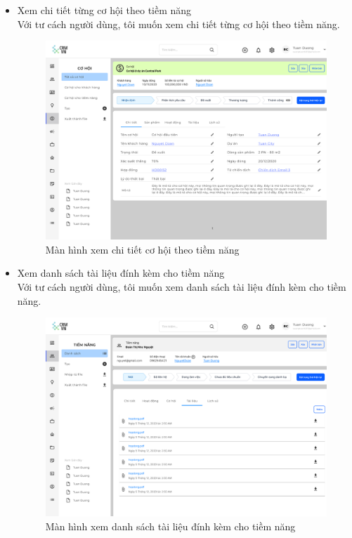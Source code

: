 \documentclass[12pt,a4paper]{article}
\begin{document}
\begin{enumerate}
\begin{itemize}
            \item Xem chi tiết từng cơ hội theo tiềm năng \\
            Với tư cách người dùng, tôi muốn xem chi tiết từng cơ hội theo tiềm năng.

            \begin{figure}[H]
                \centering \includegraphics[width=\textwidth]{Img/Nguyet/chitietcohoi.png}
                \vspace{0.5cm}
                \caption{Màn hình xem chi tiết cơ hội theo tiềm năng}
                \label{chitietcohoi}
            \end{figure}

            \item Xem danh sách tài liệu đính kèm cho tiềm năng \\
            Với tư cách người dùng, tôi muốn xem danh sách tài liệu đính kèm cho tiềm năng.

            \begin{figure}[H]
                \centering \includegraphics[width=\textwidth]{Img/Nguyet/danhsachtailieu.png}
                \vspace{0.5cm}
                \caption{Màn hình xem danh sách tài liệu đính kèm cho tiềm năng}
                \label{danhsachtailieu}
            \end{figure}


\end{itemize}
\end{enumerate}
\end{document}
